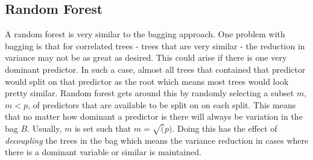 \subsection{Random Forest}

A random forest is very similar to the bagging approach. One problem with bagging is that for correlated trees - trees that are very similar - the reduction in variance may not be as great as desired. This could arise if there is one very dominant predictor. In such a case, almost all trees that contained that predictor would split on that predictor as the root which means most trees would look pretty similar. Random forest gets around this by randomly selecting a subset $m$, $m<p$, of predictors that are available to be split on on each split. This means that no matter how dominant a predictor is there will always be variation in the bag $B$. Usually, $m$ is set such that $m=\sqrt(p)$. Doing this has the effect of \textit{decoupling} the trees in the bag which means the variance reduction in cases where there is a dominant variable or similar is maintained.
